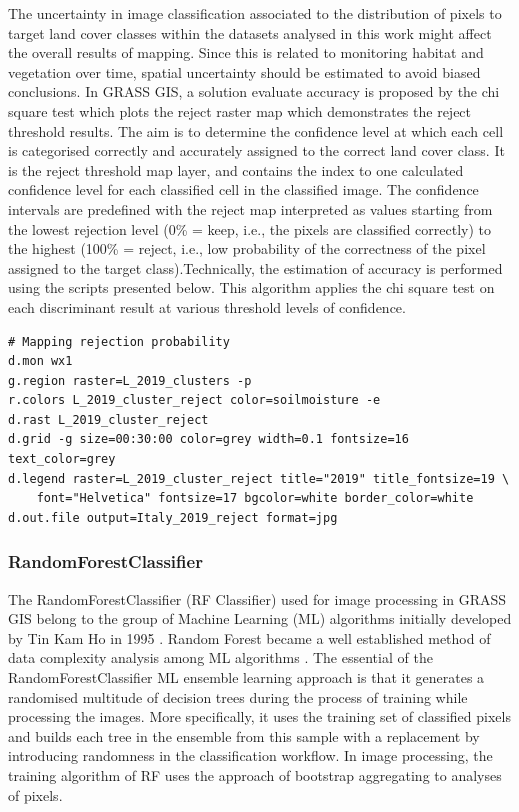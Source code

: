 \documentclass{elektr}
\begin{document}
The uncertainty in image classification associated to the distribution of pixels to target land cover classes within the datasets analysed in this work might affect the overall results of mapping. Since this is related to monitoring habitat and vegetation over time, spatial uncertainty should be estimated to avoid biased conclusions. In GRASS GIS, a solution evaluate accuracy is proposed by the chi square test which plots the reject raster map which demonstrates the reject threshold results. The aim is to determine the confidence level at which each cell is categorised correctly and accurately assigned to the correct land cover class. It is the reject threshold map layer, and contains the index to one calculated confidence level for each classified cell in the classified image. The confidence intervals are predefined with the reject map interpreted as values starting from the lowest rejection level (0\% = keep, i.e., the pixels are classified correctly) to the highest (100\% = reject, i.e., low probability of the correctness of the pixel assigned to the target class).Technically, the estimation of accuracy is performed using the scripts presented below. This algorithm applies the chi square test on each discriminant result at various threshold levels of confidence. 

\begin{footnotesize}
\begin{verbatim}
# Mapping rejection probability
d.mon wx1
g.region raster=L_2019_clusters -p
r.colors L_2019_cluster_reject color=soilmoisture -e
d.rast L_2019_cluster_reject
d.grid -g size=00:30:00 color=grey width=0.1 fontsize=16 text_color=grey
d.legend raster=L_2019_cluster_reject title="2019" title_fontsize=19 \
	font="Helvetica" fontsize=17 bgcolor=white border_color=white
d.out.file output=Italy_2019_reject format=jpg
\end{verbatim}
\end{footnotesize}

\subsubsection{RandomForestClassifier}

The RandomForestClassifier (RF Classifier) used for image processing in GRASS GIS belong to the group of Machine Learning (ML) algorithms initially developed by Tin Kam Ho in 1995 \cite{598994}. Random Forest became a well established method of data complexity analysis among ML algorithms \cite{990132}. The essential of the RandomForestClassifier ML ensemble learning approach is that it generates a randomised multitude of decision trees during the process of training while processing the images. More specifically, it uses the training set of classified pixels and builds each tree in the ensemble from this sample with a replacement by introducing randomness in the classification workflow. In image processing, the training algorithm of RF uses the approach of bootstrap aggregating to analyses of pixels. 
\end{document}
